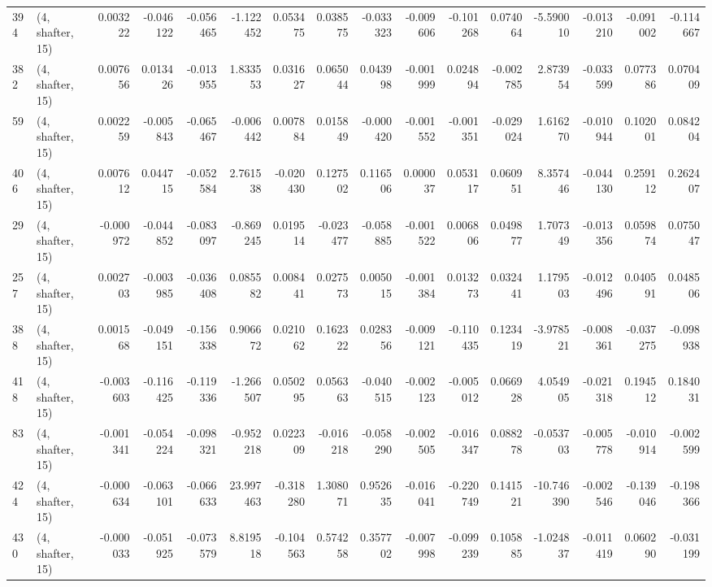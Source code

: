 \begin{tabular}{llrrrrrrrrrrrrrr}
394 &  (4, shafter, 15) &   0.003222 & -0.046122 & -0.056465 &   -1.122452 &  0.053475 &   0.038575 & -0.033323 & -0.009606 & -0.101268 &  0.074064 &   -5.590010 & -0.013210 & -0.091002 & -0.114667 \\
382 &  (4, shafter, 15) &   0.007656 &  0.013426 & -0.013955 &    1.833553 &  0.031627 &   0.065044 &  0.043998 & -0.001999 &  0.024894 & -0.002785 &    2.873954 & -0.033599 &  0.077386 &  0.070409 \\
59  &  (4, shafter, 15) &   0.002259 & -0.005843 & -0.065467 &   -0.006442 &  0.007884 &   0.015849 & -0.000420 & -0.001552 & -0.001351 & -0.029024 &    1.616270 & -0.010944 &  0.102001 &  0.084204 \\
406 &  (4, shafter, 15) &   0.007612 &  0.044715 & -0.052584 &    2.761538 & -0.020430 &   0.127502 &  0.116506 &  0.000037 &  0.053117 &  0.060951 &    8.357446 & -0.044130 &  0.259112 &  0.262407 \\
29  &  (4, shafter, 15) &  -0.000972 & -0.044852 & -0.083097 &   -0.869245 &  0.019514 &  -0.023477 & -0.058885 & -0.001522 &  0.006806 &  0.049877 &    1.707349 & -0.013356 &  0.059874 &  0.075047 \\
257 &  (4, shafter, 15) &   0.002703 & -0.003985 & -0.036408 &    0.085582 &  0.008441 &   0.027573 &  0.005015 & -0.001384 &  0.013273 &  0.032441 &    1.179503 & -0.012496 &  0.040591 &  0.048506 \\
388 &  (4, shafter, 15) &   0.001568 & -0.049151 & -0.156338 &    0.906672 &  0.021062 &   0.162322 &  0.028356 & -0.009121 & -0.110435 &  0.123419 &   -3.978521 & -0.008361 & -0.037275 & -0.098938 \\
418 &  (4, shafter, 15) &  -0.003603 & -0.116425 & -0.119336 &   -1.266507 &  0.050295 &   0.056363 & -0.040515 & -0.002123 & -0.005012 &  0.066928 &    4.054905 & -0.021318 &  0.194512 &  0.184031 \\
83  &  (4, shafter, 15) &  -0.001341 & -0.054224 & -0.098321 &   -0.952218 &  0.022309 &  -0.016218 & -0.058290 & -0.002505 & -0.016347 &  0.088278 &   -0.053703 & -0.005778 & -0.010914 & -0.002599 \\
424 &  (4, shafter, 15) &  -0.000634 & -0.063101 & -0.066633 &   23.997463 & -0.318280 &   1.308071 &  0.952635 & -0.016041 & -0.220749 &  0.141521 &  -10.746390 & -0.002546 & -0.139046 & -0.198366 \\
430 &  (4, shafter, 15) &  -0.000033 & -0.051925 & -0.073579 &    8.819518 & -0.104563 &   0.574258 &  0.357702 & -0.007998 & -0.099239 &  0.105885 &   -1.024837 & -0.011419 &  0.060290 & -0.031199 \\

\end{tabular}
